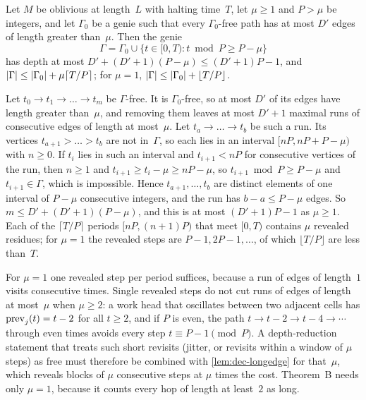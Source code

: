 \begin{lemma}\label{lem:dec-longedge}
\notformalized
Let $M$ be oblivious at length~$L$ with halting time~$T$, let $\mu\ge1$ and $P>\mu$ be integers, and let $\Gamma_0$
be a genie such that every $\Gamma_0$-free path has at most $D'$ edges of length greater than~$\mu$. Then the genie
\[
  \Gamma=\Gamma_0\cup\{t\in[0,T):t\bmod P\ge P-\mu\}
\]
has depth at most $D'+(D'+1)(P-\mu)\le(D'+1)P-1$, and $\lvert \Gamma \rvert\le\lvert \Gamma_0 \rvert+\mu\lceil T/P\rceil$; for
$\mu=1$, $\lvert \Gamma \rvert\le\lvert \Gamma_0 \rvert+\lfloor T/P\rfloor$.
\end{lemma}

\begin{informalproof}
Let $t_0\to t_1\to\dots\to t_m$ be $\Gamma$-free. It is $\Gamma_0$-free, so at most $D'$ of its edges have length
greater than~$\mu$, and removing them leaves at most $D'+1$ maximal runs of consecutive edges of length at most~$\mu$.
Let $t_a\to\dots\to t_b$ be such a run. Its vertices $t_{a+1}>\dots>t_b$ are not in~$\Gamma$, so each lies in an
interval $[nP,nP+P-\mu)$ with $n\ge0$. If $t_i$ lies in such an interval and $t_{i+1}<nP$ for consecutive
vertices of the run, then $n\ge1$ and $t_{i+1}\ge t_i-\mu\ge nP-\mu$, so $t_{i+1}\bmod P\ge P-\mu$ and
$t_{i+1}\in\Gamma$, which is impossible. Hence $t_{a+1},\dots,t_b$ are distinct elements of one interval of $P-\mu$
consecutive integers, and the run has $b-a\le P-\mu$ edges. So $m\le D'+(D'+1)(P-\mu)$, and this is at most
$(D'+1)P-1$ as $\mu\ge1$. Each of the $\lceil T/P\rceil$ periods $[nP,(n+1)P)$ that meet $[0,T)$ contains $\mu$
revealed residues; for $\mu=1$ the revealed steps are $P-1,2P-1,\dots$, of which $\lfloor T/P\rfloor$ are less
than~$T$.
\end{informalproof}

\begin{remark}\label{rem:dec-jitter}
For $\mu=1$ one revealed step per period suffices, because a run of edges of length~$1$ visits consecutive times.
Single revealed steps do not cut runs of edges of length at most~$\mu$ when $\mu\ge2$: a work head that oscillates
between two adjacent cells has $\mathrm{prev}_j(t)=t-2$ for all $t\ge2$, and if $P$ is even, the path $t\to t-2\to t-4\to
\cdots$ through even times avoids every step $t\equiv P-1\pmod P$. A depth-reduction statement that treats such short
revisits (jitter, or revisits within a window of $\mu$ steps) as free must therefore be combined with
\cref{lem:dec-longedge} for that~$\mu$, which reveals blocks of $\mu$ consecutive steps at $\mu$ times the cost.
Theorem~B needs only $\mu=1$, because it counts every hop of length at least~$2$ as long.
\end{remark}


